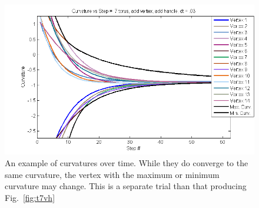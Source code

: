 \documentclass[12pt]{article}
\begin{document}
\begin{figure}
\begin{center}
\includegraphics[scale = 0.8]{curvcurves.png}
\caption{An example of curvatures over time. While they do converge to the same curvature, the vertex with the maximum or minimum curvature may change. This is a separate trial than that producing Fig.~\ref{fig:t7vh}}
\end{center}
\end{figure}
\end{document}
